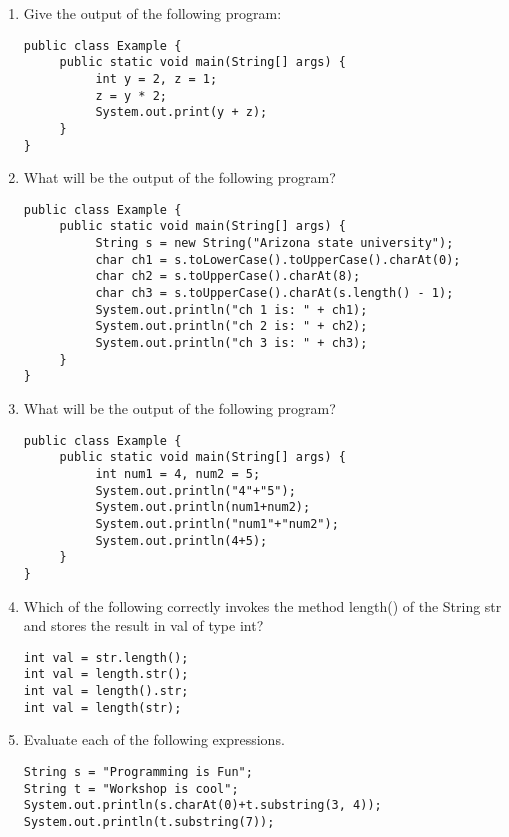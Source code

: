 \setcounter{counter}{1}
\begin{enumerate}[label={\arabic{counter}\addtocounter{counter}{1}}.]

\item Give the output of the following program:
\begin{lstlisting}
public class Example {
     public static void main(String[] args) {
          int y = 2, z = 1;
          z = y * 2;
          System.out.print(y + z);
     }
}
\end{lstlisting}

\item What will be the output of the following program?
\begin{lstlisting}
public class Example {
     public static void main(String[] args) {
          String s = new String("Arizona state university");
          char ch1 = s.toLowerCase().toUpperCase().charAt(0);
          char ch2 = s.toUpperCase().charAt(8);
          char ch3 = s.toUpperCase().charAt(s.length() - 1);
          System.out.println("ch 1 is: " + ch1);
          System.out.println("ch 2 is: " + ch2);
          System.out.println("ch 3 is: " + ch3);
     }
}
\end{lstlisting}


\item What will be the output of the following program?
\begin{lstlisting}
public class Example {
     public static void main(String[] args) {
          int num1 = 4, num2 = 5;
          System.out.println("4"+"5");
          System.out.println(num1+num2);
          System.out.println("num1"+"num2");
          System.out.println(4+5);
     }
}
\end{lstlisting}


\item Which of the following correctly invokes the method length() of the String str and stores the result in val of type int?
\begin{lstlisting}
int val = str.length();
int val = length.str();
int val = length().str;
int val = length(str);
\end{lstlisting}

\item Evaluate each of the following expressions.
\begin{lstlisting}
String s = "Programming is Fun";
String t = "Workshop is cool";
System.out.println(s.charAt(0)+t.substring(3, 4));
System.out.println(t.substring(7));
\end{lstlisting}


\end{enumerate}
